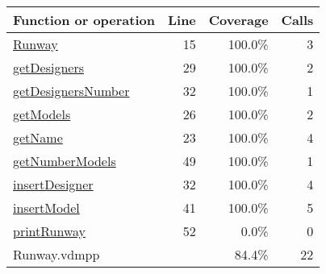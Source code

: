 \begin{longtable}{|l|r|r|r|}
\hline
Function or operation & Line & Coverage & Calls \\
\hline
\hline
\hyperref[Runway:15]{Runway} & 15&100.0\% & 3 \\
\hline
\hyperref[getDesigners:29]{getDesigners} & 29&100.0\% & 2 \\
\hline
\hyperref[getDesignersNumber:32]{getDesignersNumber} & 32&100.0\% & 1 \\
\hline
\hyperref[getModels:26]{getModels} & 26&100.0\% & 2 \\
\hline
\hyperref[getName:23]{getName} & 23&100.0\% & 4 \\
\hline
\hyperref[getNumberModels:49]{getNumberModels} & 49&100.0\% & 1 \\
\hline
\hyperref[insertDesigner:32]{insertDesigner} & 32&100.0\% & 4 \\
\hline
\hyperref[insertModel:41]{insertModel} & 41&100.0\% & 5 \\
\hline
\hyperref[printRunway:52]{printRunway} & 52&0.0\% & 0 \\
\hline
\hline
Runway.vdmpp & & 84.4\% & 22 \\
\hline
\end{longtable}


